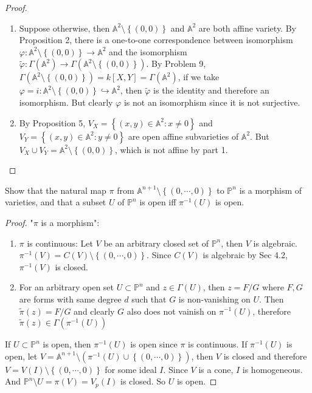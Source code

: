 \documentclass{solution}
\begin{document}
\begin{proof}
    \begin{enumerate}
        \item Suppose otherwise, then $\mathbb{A}^2 \setminus \left\lbrace (0, 0) \right\rbrace$ and $\mathbb{A}^2$ are both affine variety. By Proposition 2, there is a one-to-one correspondence between isomorphism $\varphi: \mathbb{A}^2 \setminus \left\lbrace (0, 0) \right\rbrace \rightarrow \mathbb{A}^2$ and the isomorphism $\tilde{\varphi}: \Gamma(\mathbb{A}^2) \rightarrow \Gamma(\mathbb{A}^2 \setminus \left\lbrace (0, 0) \right\rbrace)$. By Problem 9, $\Gamma(\mathbb{A}^2 \setminus \left\lbrace (0, 0) \right\rbrace) = k[X, Y] = \Gamma(\mathbb{A}^2)$, if we take $\varphi = i: \mathbb{A}^2 \setminus \left\lbrace (0, 0) \right\rbrace \hookrightarrow \mathbb{A}^2$, then $\tilde{\varphi}$ is the identity and therefore an isomorphism. But clearly $\varphi$ is not an isomorphism since it is not surjective.
        \item By Proposition 5, $V_{X} = \left\lbrace (x, y) \in \mathbb{A}^2: x \ne 0 \right\rbrace$ and $V_{Y} = \left\lbrace (x, y) \in \mathbb{A}^2: y \ne 0 \right\rbrace$ are open affine subvarieties of $\mathbb{A}^2$. But $V_X \cup V_Y = \mathbb{A}^2 \setminus \left\lbrace (0, 0) \right\rbrace$, which is not affine by part 1.
    \end{enumerate}
\end{proof}

\begin{problem}{6.18}
    Show that the natural map $\pi$ from $\mathbb{A}^{n + 1} \setminus \left\lbrace (0, \cdots, 0) \right\rbrace$ to $\mathbb{P}^n$ is a morphism of varieties, and that a subset $U$ of $\mathbb{P}^n$ is open iff $\pi ^{-1}(U)$ is open.
\end{problem}

\begin{proof}
    "$\pi$ is a morphism":
    \begin{enumerate}
        \item $\pi$ is continuous: Let $V$ be an arbitrary closed set of $\mathbb{P}^n$, then $V$ is algebraic. $\pi ^{-1}(V) = C(V) \setminus \left\lbrace (0, \cdots, 0) \right\rbrace$. Since $C(V)$ is algebraic by Sec 4.2, $\pi ^{-1}(V)$ is closed.
        \item For an arbitrary open set $U \subset \mathbb{P}^n$ and $z \in \Gamma (U)$, then $z = F / G$ where $F, G$ are forms with same degree $d$ such that $G$ is non-vanishing on $U$. Then $\tilde{\pi}(z) = F / G$ and clearly $G$ also does not vainish on $\pi ^{-1} (U)$, therefore $\tilde{\pi}(z) \in \Gamma(\pi ^{-1} (U))$
    \end{enumerate}

    If $U \subset \mathbb{P}^n$ is open, then $\pi ^{-1}(U)$ is open since $\pi$ is continuous. If $\pi ^{-1}(U)$ is open, let $V = \mathbb{A}^{n + 1} \setminus (\pi ^{-1}(U) \cup \left\lbrace (0, \cdots, 0) \right\rbrace)$, then $V$ is closed and therefore $V = V(I) \setminus \left\lbrace (0, \cdots, 0) \right\rbrace$ for some ideal $I$. Since $V$ is a cone, $I$ is homogeneous. And $\mathbb{P}^n \setminus U = \pi(V) = V_p(I)$ is closed. So $U$ is open.
\end{proof}
\end{document}
